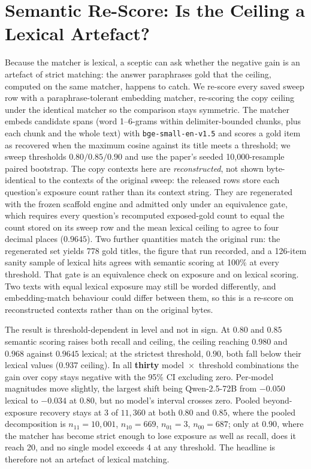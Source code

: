 \documentclass[10pt,twocolumn]{article}
\begin{document}
\section{Semantic Re-Score: Is the Ceiling a Lexical Artefact?}\label{sec:rescore}
Because the matcher is lexical, a sceptic can ask whether the negative gain is an artefact of strict
matching: the answer paraphrases gold that the ceiling, computed on the same matcher, happens to
catch. We re-score every saved sweep row with a paraphrase-tolerant embedding matcher, re-scoring the
copy ceiling under the identical matcher so the comparison stays symmetric. The matcher embeds
candidate spans (word 1--6-grams within delimiter-bounded chunks, plus each chunk and the whole text)
with \texttt{bge-small-en-v1.5} and scores a gold item as recovered when the maximum cosine against
its title meets a threshold; we sweep thresholds $0.80/0.85/0.90$ and use the paper's seeded
10{,}000-resample paired bootstrap. The copy contexts here are \emph{reconstructed}, not shown byte-identical to the
contexts of the original sweep: the released rows store each question's exposure count rather than
its context string. They are regenerated with the frozen scaffold engine and admitted only under an
equivalence gate, which requires every question's recomputed exposed-gold count to equal the count
stored on its sweep row and the mean lexical ceiling to agree to four decimal places ($0.9645$).
Two further quantities match the original run: the regenerated set yields 778 gold titles, the
figure that run recorded, and a 126-item sanity sample of lexical hits agrees with semantic scoring
at 100\% at every threshold. That gate is an equivalence check on exposure and on lexical scoring.
Two texts with equal lexical exposure may still be worded differently, and embedding-match
behaviour could differ between them, so this is a re-score on reconstructed contexts rather than on
the original bytes.

The result is threshold-dependent in level and not in sign. At $0.80$ and $0.85$ semantic scoring
raises both recall and ceiling, the ceiling reaching $0.980$ and $0.968$ against $0.9645$ lexical; at
the strictest threshold, $0.90$, both fall below their lexical values ($0.937$ ceiling). In all
\textbf{thirty} model~$\times$~threshold combinations the gain over copy stays negative with the
95\% CI excluding zero. Per-model magnitudes move slightly, the largest shift being Qwen-2.5-72B from
$-0.050$ lexical to $-0.034$ at $0.80$, but no model's interval crosses zero. Pooled beyond-exposure
recovery stays at 3 of $11{,}360$ at both $0.80$ and $0.85$, where the pooled decomposition is
$n_{11}=10{,}001$, $n_{10}=669$, $n_{01}=3$, $n_{00}=687$; only at $0.90$, where the matcher has
become strict enough to lose exposure as well as recall, does it reach 20, and no single model
exceeds 4 at any threshold. The headline is therefore not an artefact of lexical matching.
\end{document}
